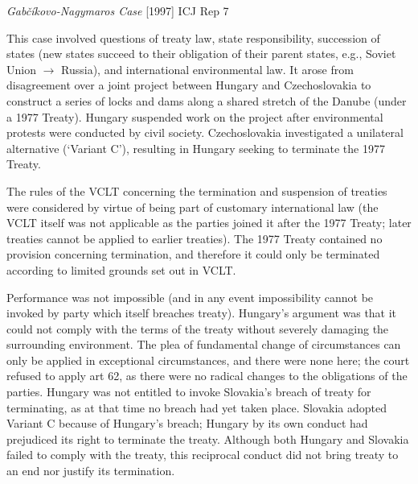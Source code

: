 \begin{casedetails}{\textit{Gabčíkovo-Nagymaros Case} [1997] ICJ Rep 7}\label{case:[1997] ICJ Rep 7}
    \flushleft

    This case involved questions of treaty law, state responsibility, succession of states (new states succeed to their obligation of their parent states, e.g., Soviet Union $\rightarrow$ Russia), and international environmental law. It arose from disagreement over a joint project between Hungary and Czechoslovakia to construct a series of locks and dams along a shared stretch of the Danube (under a 1977 Treaty). Hungary suspended work on the project after environmental protests were conducted by civil society. Czechoslovakia investigated a unilateral alternative (`Variant C'), resulting in Hungary seeking to terminate the 1977 Treaty.

    \vspace{\baselineskip}
    
    The rules of the VCLT concerning the termination and suspension of treaties were considered by virtue of being part of customary international law (the VCLT itself was not applicable as the parties joined it after the 1977 Treaty; later treaties cannot be applied to earlier treaties). The 1977 Treaty contained no provision concerning termination, and therefore it could only be terminated according to limited grounds set out in VCLT. 
    
    \vspace{\baselineskip}
    
    Performance was not impossible (and in any event impossibility cannot be invoked by party which itself breaches treaty). Hungary's argument was that it could not comply with the terms of the treaty without severely damaging the surrounding environment. The plea of fundamental change of circumstances can only be applied in exceptional circumstances, and there were none here; the court refused to apply art 62, as there were no radical changes to the obligations of the parties. Hungary was not entitled to invoke Slovakia's breach of treaty for terminating, as at that time no breach had yet taken place. Slovakia adopted Variant C because of Hungary's breach; Hungary by its own conduct had prejudiced its right to terminate the treaty. Although both Hungary and Slovakia failed to comply with the treaty, this reciprocal conduct did not bring treaty to an end nor justify its termination.

    \vspace{\baselineskip}


\end{casedetails}
